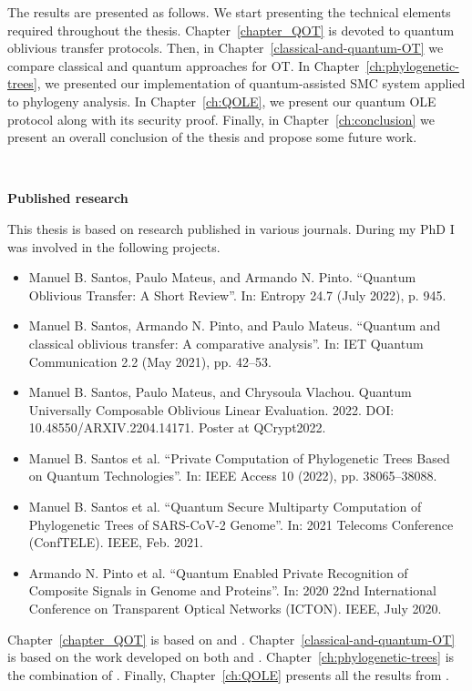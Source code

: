 The results are presented as follows. We start presenting the technical elements required throughout the thesis. Chapter~\ref{chapter_QOT} is devoted to quantum oblivious transfer protocols. Then, in Chapter~\ref{classical-and-quantum-OT} we compare classical and quantum approaches for OT. In Chapter~\ref{ch:phylogenetic-trees}, we presented our implementation of quantum-assisted SMC system applied to phylogeny analysis. In Chapter~\ref{ch:QOLE}, we present our quantum OLE protocol along with its security proof. Finally, in Chapter~\ref{ch:conclusion} we present an overall conclusion of the thesis and propose some future work.


\

\noindent\textbf{Published research}

This thesis is based on research published in various journals. During my PhD I was involved in the following projects.

\begin{itemize}
	\item\cite{SMP22} Manuel B. Santos, Paulo Mateus, and Armando N. Pinto. “Quantum Oblivious Transfer:
A Short Review”. In: Entropy 24.7 (July 2022), p. 945.

	\item\cite{SPM21} Manuel B. Santos, Armando N. Pinto, and Paulo Mateus. “Quantum and classical
oblivious transfer: A comparative analysis”. In: IET Quantum Communication 2.2 (May 2021), pp. 42–53.

	\item\cite{SMV22} Manuel B. Santos, Paulo Mateus, and Chrysoula Vlachou. Quantum Universally
Composable Oblivious Linear Evaluation. 2022. DOI: 10.48550/ARXIV.2204.14171. Poster at QCrypt2022.

	\item\cite{SGPM22} Manuel B. Santos et al. “Private Computation of Phylogenetic Trees Based on Quantum
Technologies”. In: IEEE Access 10 (2022), pp. 38065–38088.

	\item\cite{SGPM21} Manuel B. Santos et al. “Quantum Secure Multiparty Computation of Phylogenetic Trees of SARS-CoV-2 Genome”. In: 2021 Telecoms Conference (ConfTELE). IEEE, Feb. 2021.

\item\cite{POS+20} Armando N. Pinto et al. “Quantum Enabled Private Recognition of Composite Signals
in Genome and Proteins”. In: 2020 22nd International Conference on Transparent Optical
Networks (ICTON). IEEE, July 2020. 
\end{itemize}

Chapter~\ref{chapter_QOT} is based on \cite{SMP22} and \cite{SGPM22}. Chapter~\ref{classical-and-quantum-OT} is based on the work developed on both \cite{SPM21} and \cite{SGPM22}. Chapter~\ref{ch:phylogenetic-trees} is the combination of \cite{SGPM22, SGPM21, POS+20}. Finally, Chapter~\ref{ch:QOLE} presents all the results from \cite{SMV22}. 

%
%
%
